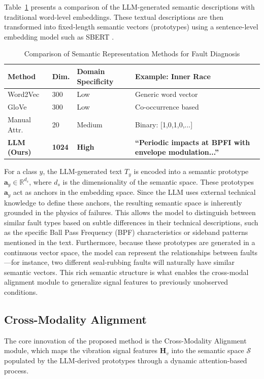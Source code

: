\documentclass[journal]{IEEEtran}
\begin{document}
Table~\ref{tab:llm_semantics} presents a comparison of the LLM-generated semantic descriptions with traditional word-level embeddings. These textual descriptions are then transformed into fixed-length semantic vectors (prototypes) using a sentence-level embedding model such as SBERT \cite{reimers2019sentence}.

\begin{table}[!t]
\centering
\caption{Comparison of Semantic Representation Methods for Fault Diagnosis}
\label{tab:llm_semantics}
\renewcommand{\arraystretch}{1.2}
\begin{tabular}{p{1.8cm}p{1.2cm}p{1.5cm}p{2.2cm}}
\toprule
\textbf{Method} & \textbf{Dim.} & \textbf{Domain Specificity} & \textbf{Example: Inner Race} \\
\midrule
Word2Vec & 300 & Low & Generic word vector \\
GloVe & 300 & Low & Co-occurrence based \\
Manual Attr. & 20 & Medium & Binary: [1,0,1,0,...] \\
\textbf{LLM (Ours)} & \textbf{1024} & \textbf{High} & \textbf{``Periodic impacts at BPFI with envelope modulation...''} \\
\bottomrule
\end{tabular}
\end{table}

For a class $y$, the LLM-generated text $T_y$ is encoded into a semantic prototype $\mathbf{a}_y \in \mathbb{R}^{d_s}$, where $d_s$ is the dimensionality of the semantic space. These prototypes $\mathbf{a}_y$ act as anchors in the embedding space. Since the LLM uses external technical knowledge to define these anchors, the resulting semantic space is inherently grounded in the physics of failures. This allows the model to distinguish between similar fault types based on subtle differences in their technical descriptions, such as the specific Ball Pass Frequency (BPF) characteristics or sideband patterns mentioned in the text. Furthermore, because these prototypes are generated in a continuous vector space, the model can represent the relationships between faults—for instance, two different seal-rubbing faults will naturally have similar semantic vectors. This rich semantic structure is what enables the cross-modal alignment module to generalize signal features to previously unobserved conditions.

\subsection{Cross-Modality Alignment}
The core innovation of the proposed method is the Cross-Modality Alignment module, which maps the vibration signal features $\mathbf{H}_v$ into the semantic space $\mathcal{S}$ populated by the LLM-derived prototypes through a dynamic attention-based process.
\end{document}
